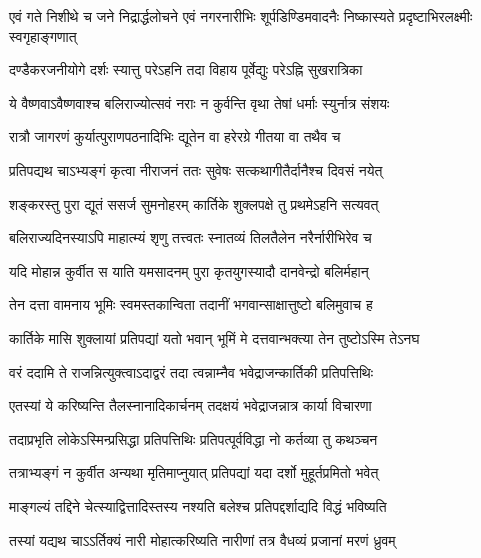\threelineshloka
{एवं गते निशीथे च जने निद्रार्द्धलोचने}
{एवं नगरनारीभिः शूर्पडिण्डिमवादनैः}
{निष्कास्यते प्रदृष्टाभिरलक्ष्मीः स्वगृहाङ्गणात्} %

\twolineshloka
{दण्डैकरजनीयोगे दर्शः स्यात्तु परेऽहनि}
{तदा विहाय पूर्वेद्युः परेऽह्नि सुखरात्रिका} %

\twolineshloka
{ये वैष्णवाऽवैष्णवाश्च बलिराज्योत्सवं नराः}
{न कुर्वन्ति वृथा तेषां धर्माः स्युर्नात्र संशयः} %

\twolineshloka
{रात्रौ जागरणं कुर्यात्पुराणपठनादिभिः}
{द्यूतेन वा हरेरग्रे गीतया वा तथैव च} %





\twolineshloka
{प्रतिपद्यथ चाऽभ्यङ्गं कृत्वा नीराजनं ततः}
{सुवेषः सत्कथागीतैर्दानैश्च दिवसं नयेत्} %

\twolineshloka
{शङ्करस्तु पुरा द्यूतं ससर्ज सुमनोहरम्}
{कार्तिके शुक्लपक्षे तु प्रथमेऽहनि सत्यवत्} %

\twolineshloka
{बलिराज्यदिनस्याऽपि माहात्म्यं शृणु तत्त्वतः}
{स्नातव्यं तिलतैलेन नरैर्नारीभिरेव च} %

\twolineshloka
{यदि मोहान्न कुर्वीत स याति यमसादनम्}
{पुरा कृतयुगस्यादौ दानवेन्द्रो बलिर्महान्} %

\twolineshloka
{तेन दत्ता वामनाय भूमिः स्वमस्तकान्विता}
{तदानीं भगवान्साक्षात्तुष्टो बलिमुवाच ह} %

\twolineshloka
{कार्तिके मासि शुक्लायां प्रतिपद्यां यतो भवान्}
{भूमिं मे दत्तवान्भक्त्या तेन तुष्टोऽस्मि तेऽनघ} %

\twolineshloka
{वरं ददामि ते राजन्नित्युक्त्वाऽदाद्वरं तदा}
{त्वन्नाम्नैव भवेद्राजन्कार्तिकी प्रतिपत्तिथिः} %

\twolineshloka
{एतस्यां ये करिष्यन्ति तैलस्नानादिकार्चनम्}
{तदक्षयं भवेद्राजन्नात्र कार्या विचारणा} %

\twolineshloka
{तदाप्रभृति लोकेऽस्मिन्प्रसिद्धा प्रतिपत्तिथिः}
{प्रतिपत्पूर्वविद्धा नो कर्तव्या तु कथञ्चन} %

\twolineshloka
{तत्राभ्यङ्गं न कुर्वीत अन्यथा मृतिमाप्नुयात्}
{प्रतिपद्यां यदा दर्शो मुहूर्तप्रमितो भवेत्} %

\twolineshloka
{माङ्गल्यं तद्दिने चेत्स्याद्वित्तादिस्तस्य नश्यति}
{बलेश्च प्रतिपद्दर्शाद्यदि विद्धं भविष्यति} %

\twolineshloka
{तस्यां यद्यथ चाऽऽर्तिक्यं नारी मोहात्करिष्यति}
{नारीणां तत्र वैधव्यं प्रजानां मरणं ध्रुवम्} %

